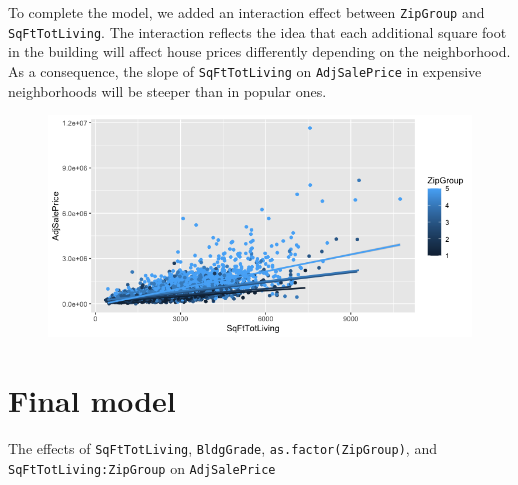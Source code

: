 \documentclass[12pt,a4paper]{article}
\begin{document}
	To complete the model, we added an interaction effect between \texttt{ZipGroup} and \texttt{SqFtTotLiving}. The interaction reflects the idea that each additional square foot in the building will affect house prices differently depending on the neighborhood. As a consequence, the slope of \texttt{SqFtTotLiving} on \texttt{AdjSalePrice} in expensive neighborhoods will be steeper than in popular ones.

		

		\begin{figure}[H]
			\centering
			\includegraphics[width=1\linewidth]{Rplot}
			\caption{}
			\label{fig:rplot}
		\end{figure}

\vspace{.5cm}

\section{Final model}

The effects of \texttt{SqFtTotLiving}, \texttt{BldgGrade}, \texttt{as.factor(ZipGroup)}, and \texttt{SqFtTotLiving:ZipGroup} on \texttt{AdjSalePrice}

	 
\end{document}
